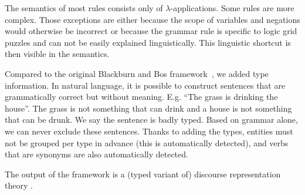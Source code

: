 The semantics of most rules consists only of $\lambda$-applications. Some rules are more complex. Those exceptions are either because the scope of variables and negations would otherwise be incorrect or because the grammar rule is specific to logic grid puzzles and can not be easily explained linguistically. This linguistic shortcut is then visible in the semantics.

Compared to the original Blackburn and Bos framework~\cite{Blackburn2005,Blackburn2006}, we added type information. In natural language, it is possible to construct sentences that are grammatically correct but without meaning. E.g. ``The grass is drinking the house''. The grass is not something that can drink and a house is not something that can be drunk. We say the sentence is badly typed. Based on grammar alone, we can never exclude these sentences. Thanks to adding the types, entities must not be grouped per type in advance (this is automatically detected), and verbs that are synonyms are also automatically detected.


The output of the framework is a (typed variant of) discourse representation theory \cite{DRT}.


